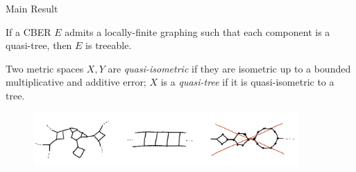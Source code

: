 \documentclass{beamer}
\begin{document}
    \begin{frame}{Main Result}
        \begin{theorem}
            If a CBER $E$ admits a locally-finite graphing such that each component is a quasi-tree, then $E$ is treeable.
        \end{theorem}

        \pause
        \vspace{0.1in}

        \scriptsize{
            Two metric spaces $X,Y$ are \textit{quasi-isometric} if they are isometric up to a bounded multiplicative and additive error; $X$ is a \textit{quasi-tree} if it is quasi-isometric to a tree.
            \vspace{-0.3in}
            \begin{figure}[h]
                \center
                \includegraphics[width=0.9\textwidth]{img/quasi_tree.png}
            \end{figure}
        }
    \end{frame}
\end{document}
